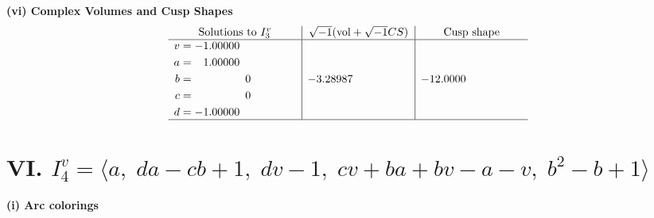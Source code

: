 \documentclass[1p]{elsarticle_modified}
\theoremstyle{definition}
\newcommand{\I}{\sqrt{-1}}
\begin{document}
\newpage\flushleft \textbf{(vi) Complex Volumes and Cusp Shapes}
$$\begin{array}{c|c|c}  
\text{Solutions to }I^v_{3}& \I (\text{vol} + \sqrt{-1}CS) & \text{Cusp shape}\\
 \hline 
\begin{aligned}
v &= -1.00000\phantom{ +0.000000I} \\
a &= \phantom{-}1.00000\phantom{ +0.000000I} \\
b &= \phantom{-0.000000 } 0 \\
c &= \phantom{-0.000000 } 0 \\
d &= -1.00000\phantom{ +0.000000I}\end{aligned}
 & -3.28987\phantom{ +0.000000I} & -12.0000\phantom{ +0.000000I}\\
 \hline 
 \end{array}$$\newpage\newpage\renewcommand{\arraystretch}{1}
\centering \section*{VI. $I^v_{4}= \langle a,\;d a- c b+1,\;d v-1,\;c v+b a+b v- a- v,\;b^2- b+1 \rangle$}
\flushleft \textbf{(i) Arc colorings}\\
\end{document}
